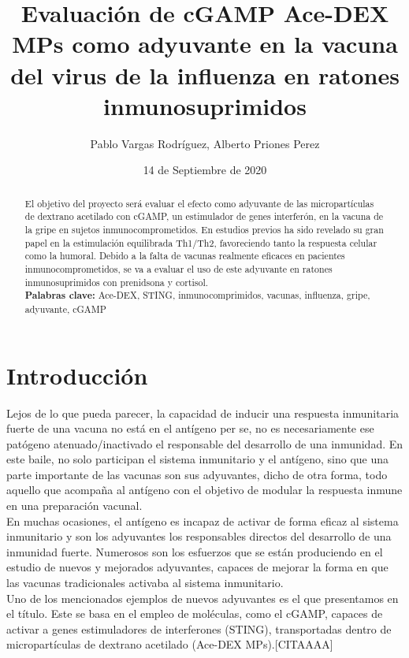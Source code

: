 \documentclass[a4paper,11pt]{article}
\providecommand{\keywords}[1]{\textbf{Palabras clave:} #1}
\begin{document}
	\title{Evaluación de cGAMP Ace-DEX MPs como adyuvante en la vacuna del virus de la influenza en ratones inmunosuprimidos}
	\author{Pablo Vargas Rodríguez, Alberto Priones Perez}
	\date{14 de Septiembre de 2020}
	\maketitle
	\begin{abstract}
El objetivo del proyecto será evaluar el efecto como adyuvante de las micropartículas de dextrano acetilado con cGAMP, un estimulador de genes interferón, en la vacuna de la gripe en sujetos inmunocomprometidos. En estudios previos ha sido revelado su gran papel en la estimulación equilibrada Th1/Th2, favoreciendo tanto la respuesta celular como la humoral. Debido a la falta de vacunas realmente eficaces en pacientes inmunocomprometidos, se va a evaluar el uso de este adyuvante en ratones inmunosuprimidos con prenidsona y cortisol.
\\
\keywords{Ace-DEX, STING, inmunocomprimidos, vacunas, influenza, gripe, adyuvante, cGAMP}
	\end{abstract}

\section{Introducción}
Lejos de lo que pueda parecer, la capacidad de inducir una respuesta inmunitaria fuerte de una vacuna no está en el antígeno per se, no es necesariamente ese patógeno atenuado/inactivado el responsable del desarrollo de una inmunidad. En este baile, no solo participan el sistema inmunitario y el antígeno, sino que una parte importante de las vacunas son sus adyuvantes, dicho de otra forma, todo aquello que acompaña al antígeno con el objetivo de modular la respuesta inmune en una preparación vacunal.
\\En muchas ocasiones, el antígeno es incapaz de activar de forma eficaz al sistema inmunitario y son los adyuvantes los responsables directos del desarrollo de una inmunidad fuerte.
Numerosos son los esfuerzos que se están produciendo en el estudio de nuevos y mejorados adyuvantes, capaces de mejorar la forma en que las vacunas tradicionales activaba al sistema inmunitario.
\\Uno de los mencionados ejemplos de nuevos adyuvantes es el que presentamos en el título. Este se basa en el empleo de moléculas, como el cGAMP, capaces de activar a genes estimuladores de interferones (STING), transportadas dentro de micropartículas de dextrano acetilado (Ace-DEX MPs).[CITAAAA]
\end{document}

